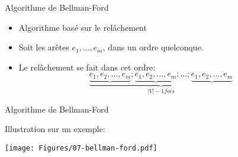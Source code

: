 
\begin{frame}{Algorithme de Bellman-Ford}

\begin{center}
{\small
{}}
\end{center}

\bigskip

\begin{itemize}
\item Algorithme basé sur le relâchement
\item Soit les arêtes $e_1,\ldots,e_m$, dans un ordre quelconque.
\item Le relâchement se fait dans cet ordre:
$$\underbrace{\underbrace{e_1,e_2,\ldots,e_m};\underbrace{e_1,e_2,\ldots,e_m};\ldots;\underbrace{e_1,e_2,\ldots,e_m}}_{|V|-1 fois}$$
\end{itemize}

\end{frame}

\begin{frame}{Algorithme de Bellman-Ford}

\begin{center}
{\small
{}}
\end{center}

\bigskip

Illustration sur un exemple:

\centerline{\texttt{[image: Figures/07-bellman-ford.pdf]}}

\end{frame}



